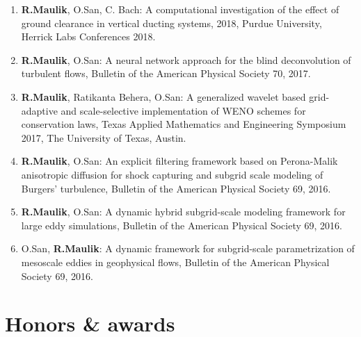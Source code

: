 \documentclass[letterpaper]{article}
\begin{document}
\begin{enumerate}
\item \textbf{R.Maulik}, O.San, C. Bach: A computational investigation of the effect of ground clearance in vertical ducting systems, 2018, Purdue University, Herrick Labs Conferences 2018. 

\item \textbf{R.Maulik}, O.San: A neural network approach for the blind deconvolution of turbulent flows, Bulletin of the American Physical Society 70, 2017.

\item \textbf{R.Maulik}, Ratikanta Behera, O.San: A generalized wavelet based grid-adaptive and scale-selective
implementation of WENO schemes for conservation laws, Texas Applied Mathematics and Engineering Symposium 2017, The University of Texas, Austin.

\item \textbf{R.Maulik}, O.San: An explicit filtering framework based on Perona-Malik anisotropic diffusion for shock capturing and subgrid scale modeling of Burgers' turbulence,  Bulletin of the American Physical Society 69, 2016.

\item \textbf{R.Maulik}, O.San:  A dynamic hybrid subgrid-scale modeling framework for large eddy simulations,  Bulletin of the American Physical Society 69, 2016.

\item O.San, \textbf{R.Maulik}: A dynamic framework for subgrid-scale parametrization of mesoscale eddies in geophysical flows, Bulletin of the American Physical Society 69, 2016.

\end{enumerate}

\section*{Honors \& awards}
\end{document}
